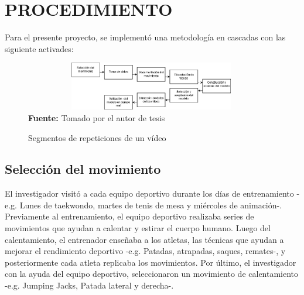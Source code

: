 \section{PROCEDIMIENTO}
Para el presente proyecto, se implement\'o una metodolog\'ia en cascadas con las siguiente activades:
\begin{figure}[H]
	\caption{Segmentos de repeticiones de un v\'ideo}
	\label{fig:segVideo}
	\centering
	\includegraphics[width=420px,height=80px]{graphics/cascada.PNG} \\
	\textbf{Fuente:} Tomado por el autor de tesis
\end{figure} 
\subsection{Selecci\'on del movimiento}
El investigador visit\'o a cada equipo deportivo durante los d\'ias de entrenamiento -e.g. Lunes de taekwondo, martes de tenis de mesa y mi\'ercoles de animaci\'on-.  Previamente al entrenamiento, el equipo deportivo realizaba series de movimientos que ayudan a calentar y estirar el cuerpo humano.  Luego del calentamiento, el entrenador ense\~naba a los atletas, las t\'ecnicas que ayudan a mejorar el rendimiento deportivo -e.g. Patadas, atrapadas, saques, remates-, y posteriormente cada atleta replicaba los movimientos. Por \'ultimo, el investigador con la ayuda del equipo deportivo, seleccionaron un movimiento de calentamiento -e.g. Jumping Jacks, Patada lateral y derecha-.
